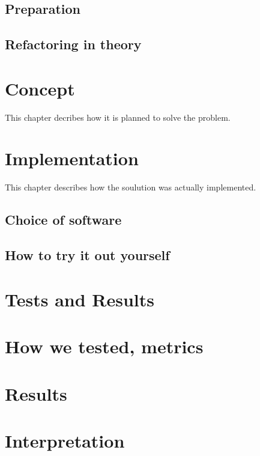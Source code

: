 \documentclass[a4paper,10pt,abstract=on]{scrreprt}
\begin{document}
\section{Preparation}
\section{Refactoring in theory}

\chapter{Concept}
This chapter decribes how it is planned to solve the problem.

\chapter{Implementation}
This chapter describes how the soulution was actually implemented.
\section{Choice of software}
\section{}
\section{How to try it out yourself}

\chapter{Tests and Results}
\chapter{How we tested, metrics}
\chapter{Results}
\chapter{Interpretation}

\end{document}
